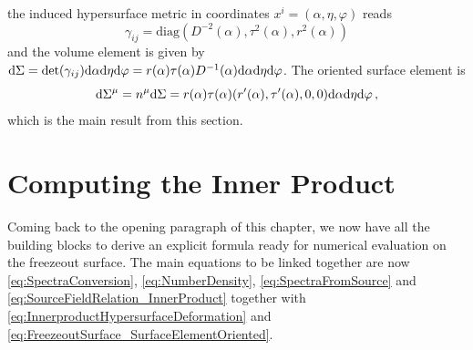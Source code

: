 the induced hypersurface metric in coordinates ${x^i=(\alpha,\eta,\varphi)}$ reads
    \begin{equation}
        \gamma_{ij}=\text{diag}(D^{-2}(\alpha),\tau^2(\alpha),r^2(\alpha))
    \end{equation}
and the volume element is given by ${\text{d}\Sigma=\det(\gamma_{ij})\text{d}\alpha\text{d}\eta\text{d}\varphi=r(\alpha)\tau(\alpha) D^{-1}(\alpha)\text{d}\alpha\text{d}\eta\text{d}\varphi}$. The oriented surface element is 
\begin{equation}
        \text{d}\Sigma^\mu=n^\mu\text{d}\Sigma=r(\alpha)\tau(\alpha)(r^\prime(\alpha),\tau^\prime(\alpha),0,0)\text{d}\alpha\text{d}\eta\text{d}\varphi\,,
        \label{eq:FreezeoutSurface_SurfaceElementOriented}
\end{equation}
which is the main result from this section.

\section{Computing the Inner Product}

Coming back to the opening paragraph of this chapter, we now have all the building blocks to derive an explicit formula ready for numerical evaluation on the freezeout surface. The main equations to be linked together are now \eqref{eq:SpectraConversion}, \eqref{eq:NumberDensity}, \eqref{eq:SpectraFromSource} and \eqref{eq:SourceFieldRelation_InnerProduct} together with \eqref{eq:InnerproductHypersurfaceDeformation} and \eqref{eq:FreezeoutSurface_SurfaceElementOriented}.

